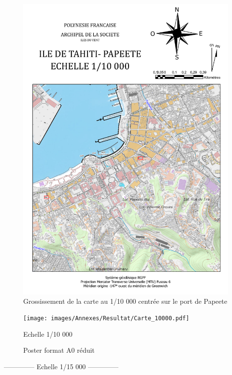 \documentclass{themeensg}
\begin{document}
\begin{appendices}
\begin{figure}[!h]
\centering
\includegraphics[width=\linewidth]{images/Annexes/Resultat/Carte_10000_A4.pdf}
\caption{Grossissement de la carte au 1/10 000 centrée sur le port de Papeete}
\label{10000_gros}
\end{figure}

\begin{figure}
\centering
\texttt{[image: images/Annexes/Resultat/Carte\_10000.pdf]}%
\caption{Poster format A0 réduit\color{red}{ Version 1}}
\colorbox{blue!10}{Echelle 1/10 000}
\label{10000}%
\end{figure}

\clearpage
\begin{center}
    \Large
    \colorbox{yellow!10}{--------------\- Echelle 1/15 000 --------------\-}
\end{center}


\end{appendices}
\end{document}
